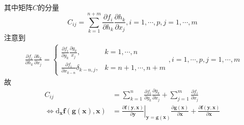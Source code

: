 \documentclass[main.tex]{subfiles}
\begin{document}
\begin{example}
\begin{align*}
    \end{align*}
    其中矩阵$C$的分量
    \[
        C_{ij}=\sum_{k=1}^{n+m}\frac{\partial f_i}{\partial h_k}\frac{\partial h_k}{\partial x_j},i=1,\cdots,p,j=1,\cdots,m
    \]
    注意到
    \begin{align*}
        \frac{\partial f_i}{\partial h_k}\frac{\partial h_k}{\partial x_j}=\left\{\begin{array}{ll}
                                                                                      \frac{\partial f_i}{\partial g_k}\frac{\partial g_k}{x_j}, & k=1,\cdots,n     \\
                                                                                      \frac{\partial f_i}{\partial x_{k-n}}\delta_{k-n,j},       & k=n+1,\cdots,n+m
                                                                                  \end{array}\right.,i=1,\cdots,p,j=1,\cdots,m
    \end{align*}
    故
    \begin{align*}
        C_{ij}                                                                                                    & =\sum_{k=1}^{n}\frac{\partial f_i}{\partial g_k}\frac{\partial g_k}{\partial x_j}+\sum_{j=1}^m\frac{\partial f_i}{\partial x_j}                                                                                                                                                                      \\
        \Leftrightarrow\mathrm{d}_{\mathbf{x}}\mathbf{f}\left(\mathbf{g}\left(\mathbf{x}\right),\mathbf{x}\right) & =\left.\frac{\partial \mathbf{f}\left(\mathbf{y},\mathbf{x}\right)}{\partial \mathbf{y}}\right|_{\mathbf{y}=\mathbf{g}\left(\mathbf{x}\right)}\frac{\partial\mathbf{g}\left(\mathbf{x}\right)}{\partial \mathbf{x}}+\frac{\partial \mathbf{f}\left(\mathbf{y},\mathbf{x}\right)}{\partial\mathbf{x}}
    \end{align*}
\end{example}
\end{document}
